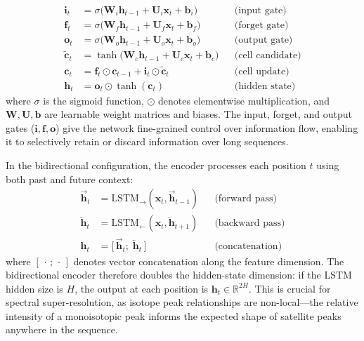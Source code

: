 \documentclass[12pt,a4paper]{report}
\begin{document}
\begin{align}
  \mathbf{i}_t &= \sigma\!\big( \mathbf{W}_i \mathbf{h}_{t-1} + \mathbf{U}_i \mathbf{x}_t + \mathbf{b}_i \big) && \text{(input gate)} \label{eq:lstm_i} \\
  \mathbf{f}_t &= \sigma\!\big( \mathbf{W}_f \mathbf{h}_{t-1} + \mathbf{U}_f \mathbf{x}_t + \mathbf{b}_f \big) && \text{(forget gate)} \label{eq:lstm_f} \\
  \mathbf{o}_t &= \sigma\!\big( \mathbf{W}_o \mathbf{h}_{t-1} + \mathbf{U}_o \mathbf{x}_t + \mathbf{b}_o \big) && \text{(output gate)} \label{eq:lstm_o} \\
  \tilde{\mathbf{c}}_t &= \tanh\!\big( \mathbf{W}_c \mathbf{h}_{t-1} + \mathbf{U}_c \mathbf{x}_t + \mathbf{b}_c \big) && \text{(cell candidate)} \label{eq:lstm_c} \\
  \mathbf{c}_t &= \mathbf{f}_t \odot \mathbf{c}_{t-1} + \mathbf{i}_t \odot \tilde{\mathbf{c}}_t && \text{(cell update)} \label{eq:lstm_cell} \\
  \mathbf{h}_t &= \mathbf{o}_t \odot \tanh(\mathbf{c}_t) && \text{(hidden state)} \label{eq:lstm_h}
\end{align}
where $\sigma$ is the sigmoid function, $\odot$ denotes elementwise multiplication, and $\mathbf{W}, \mathbf{U}, \mathbf{b}$ are learnable weight matrices and biases.  The input, forget, and output gates ($\mathbf{i}, \mathbf{f}, \mathbf{o}$) give the network fine-grained control over information flow, enabling it to selectively retain or discard information over long sequences.

In the bidirectional configuration, the encoder processes each position $t$ using both past and future context:
\begin{align}
  \overrightarrow{\mathbf{h}}_t &= \text{LSTM}_{\!\rightarrow}(\mathbf{x}_t, \overrightarrow{\mathbf{h}}_{t-1}) && \text{(forward pass)} \label{eq:bilstm_fwd} \\
  \overleftarrow{\mathbf{h}}_t &= \text{LSTM}_{\!\leftarrow}(\mathbf{x}_t, \overleftarrow{\mathbf{h}}_{t+1}) && \text{(backward pass)} \label{eq:bilstm_bwd} \\
  \mathbf{h}_t &= \big[\, \overrightarrow{\mathbf{h}}_t ;\; \overleftarrow{\mathbf{h}}_t \,\big] && \text{(concatenation)} \label{eq:bilstm_cat}
\end{align}
where $[\,\cdot\,;\,\cdot\,]$ denotes vector concatenation along the feature dimension.  The bidirectional encoder therefore doubles the hidden-state dimension: if the LSTM hidden size is $H$, the output at each position is $\mathbf{h}_t \in \mathbb{R}^{2H}$.  This is crucial for spectral super-resolution, as isotope peak relationships are non-local---the relative intensity of a monoisotopic peak informs the expected shape of satellite peaks anywhere in the sequence.
\end{document}
